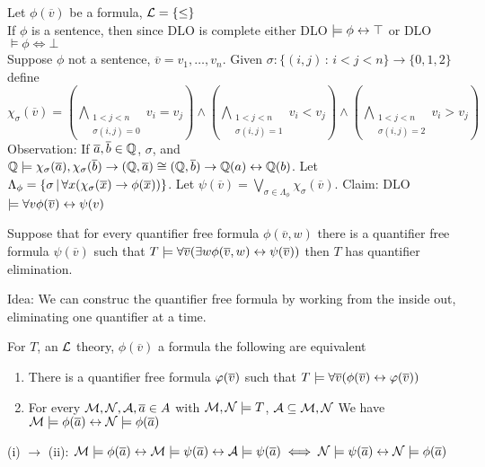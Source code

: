 \begin{pf}
    Let $\phi(\overline{v})$ be a formula, $\mathcal{L} = \{\le \}$ \\
    If $\phi$ is a sentence, then since DLO is complete either DLO $\models \phi \leftrightarrow \top$ or DLO $\models \phi \iff \bot$ \\
    Suppose $\phi$ not a sentence, $\overline{v} = v_1, \ldots, v_n$. Given $\sigma: \{(i,j) \, : \, i < j < n\} \to \{0,1,2\}$ define $\chi_{\sigma}(\overline{v}) = \left( \bigwedge_{\substack{1 < j < n \\ \sigma(i, j)=0}} v_i = v_j \right) \wedge \left( \bigwedge_{\substack{1 < j < n \\ \sigma(i, j)=1}} v_i < v_j \right) \wedge \left( \bigwedge_{\substack{1 < j < n \\ \sigma(i, j)=2}} v_i > v_j \right) $ \\
    Observation: If $\overline{a}, \overline{b} \in \mathbb{Q}$, $\sigma$, and $\mathbb{Q} \models \chi_{\sigma}(\overline{a}), \chi_{\sigma}(\overline{b}) \to (\mathbb{Q}, \overline{a}) \cong (\mathbb{Q}, \overline{b}) \to \mathbb{Q}(a) \leftrightarrow \mathbb{Q}(b)$. Let $\Lambda_{\phi} = \{ \sigma \, | \, \forall x(\chi_{\sigma}(\overline{x}) \to \phi(\overline{x}))\}$. Let $\psi(\overline{v}) = \bigvee_{\sigma \in \Lambda_{\phi}} \chi_{\sigma}(\overline{v})$. Claim: DLO $\models \forall v \phi(\overline{v}) \leftrightarrow \psi(v)$ 
\end{pf}

\begin{lemma}
    Suppose that for every quantifier free formula $\phi(\overline{v}, w)$ there is a quantifier free formula $\psi(\overline{v})$ such that $T \models \forall \overline{v} (\exists w \phi(\overline{v}, w) \leftrightarrow \psi(\overline{v}))$ then $T$ has quantifier elimination. 
\end{lemma}

\begin{pf}
    Idea: We can construc the quantifier free formula by working from the inside out, eliminating one quantifier at a time. 
\end{pf}

\begin{theorem}
    For $T$, an $\mathcal{L}$ theory, $\phi(\overline{v})$ a formula the following are equivalent
    \begin{enumerate}[label = (\roman*)]
        \item There is a quantifier free formula $\varphi(\overline{v})$ such that $T \models \forall \overline{v}(\phi(\overline{v}) \leftrightarrow \varphi(\overline{v}))$ 
        \item For every $\mathcal{M}, \mathcal{N}, \mathcal{A}, \overline{a} \in A$ with $\mathcal{M}, \mathcal{N} \models T$, $\mathcal{A} \subseteq \mathcal{M}, \mathcal{N}$ We have $\mathcal{M} \models \phi(\overline{a}) \leftrightarrow \mathcal{N} \models \phi(\overline{a})$
    \end{enumerate}
\end{theorem}

\begin{pf}
    (i) $\to$ (ii): $\mathcal{M} \models \phi(\overline{a}) \leftrightarrow \mathcal{M} \models \psi(\overline{a}) \leftrightarrow \mathcal{A} \models \psi(\overline{a}) \iff \mathcal{N} \models \psi(\overline{a}) \leftrightarrow \mathcal{N} \models \phi(\overline{a})$ 
\end{pf}